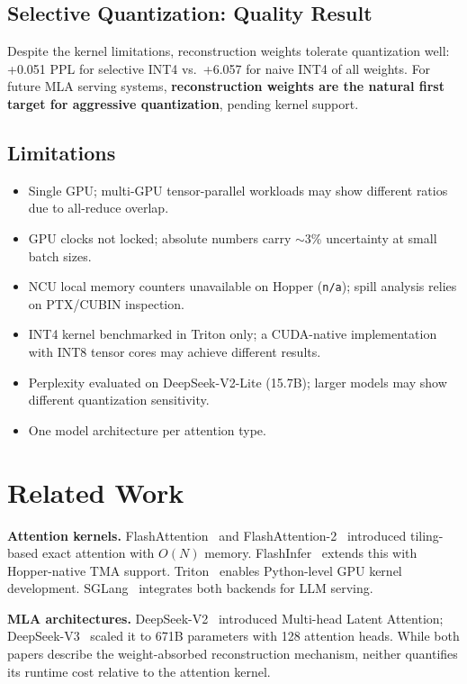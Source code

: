 \documentclass[10pt,twocolumn]{article}
\begin{document}
\subsection{Selective Quantization: Quality Result}

Despite the kernel limitations, reconstruction weights tolerate quantization well: +0.051 PPL for selective INT4 vs.\ +6.057 for naive INT4 of all weights.  For future MLA serving systems, \textbf{reconstruction weights are the natural first target for aggressive quantization}, pending kernel support.

\subsection{Limitations}

\begin{itemize}[leftmargin=*,topsep=0pt]
  \item Single GPU; multi-GPU tensor-parallel workloads may show different ratios due to all-reduce overlap.
  \item GPU clocks not locked; absolute numbers carry $\sim$3\% uncertainty at small batch sizes.
  \item NCU local memory counters unavailable on Hopper (\texttt{n/a}); spill analysis relies on PTX/CUBIN inspection.
  \item INT4 kernel benchmarked in Triton only; a CUDA-native implementation with INT8 tensor cores may achieve different results.
  \item Perplexity evaluated on DeepSeek-V2-Lite (15.7B); larger models may show different quantization sensitivity.
  \item One model architecture per attention type.
\end{itemize}

\section{Related Work}

\textbf{Attention kernels.}  FlashAttention~\cite{flashattention} and FlashAttention-2~\cite{flashattention2} introduced tiling-based exact attention with $O(N)$ memory.  FlashInfer~\cite{flashinfer} extends this with Hopper-native TMA support.  Triton~\cite{triton} enables Python-level GPU kernel development.  SGLang~\cite{sglang} integrates both backends for LLM serving.

\textbf{MLA architectures.}  DeepSeek-V2~\cite{deepseekv2} introduced Multi-head Latent Attention; DeepSeek-V3~\cite{deepseekv3} scaled it to 671B parameters with 128 attention heads.  While both papers describe the weight-absorbed reconstruction mechanism, neither quantifies its runtime cost relative to the attention kernel.
\end{document}
